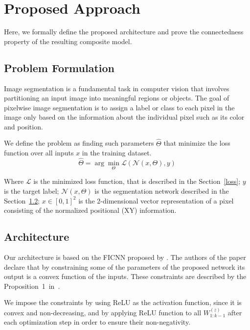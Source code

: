\section{Proposed Approach}

Here, we formally define the proposed architecture and prove the connectedness property of the resulting composite model.

\subsection{Problem Formulation}

Image segmentation is a fundamental task in computer vision that involves partitioning an input image into meaningful regions or objects.
The goal of pixelwise image segmentation is to assign a label or class to each pixel in the image only based on the information
about the individual pixel such as its color and position.

We define the problem as finding such parameters $\hat{\Theta}$ that minimize the loss function over all inputs $x$ in the training dataset.
\begin{equation}
    \hat{\Theta} = \arg \min_{\Theta} \mathcal{L}(\mathcal{N}(x, \Theta), y)
\end{equation}

Where $\mathcal{L}$ is the minimized loss function, that is described in the Section~\ref{loss};
$y$ is the target label;
$\mathcal{N}(x, \Theta)$ is the segmentation network described in the Section~\ref{architecture};
$x \in [0, 1]^2$ is the 2-dimensional vector representation of a pixel consisting of the normalized positional (XY) information.

\subsection{Architecture}
\label{architecture}

Our architecture is based on the FICNN proposed by \cite{amos2017input}.
The authors of the paper declare that by constraining some of the parameters of the proposed network
its output is a convex function of the inputs.
These constraints are described by the Proposition~1~in~\cite{amos2017input}.

We impose the constraints by using ReLU as the activation function, since it is convex and non-decreasing,
and by applying ReLU function to all $W_{1:k-1}^{(z)}$ after each optimization step in order to ensure
their non-negativity.

